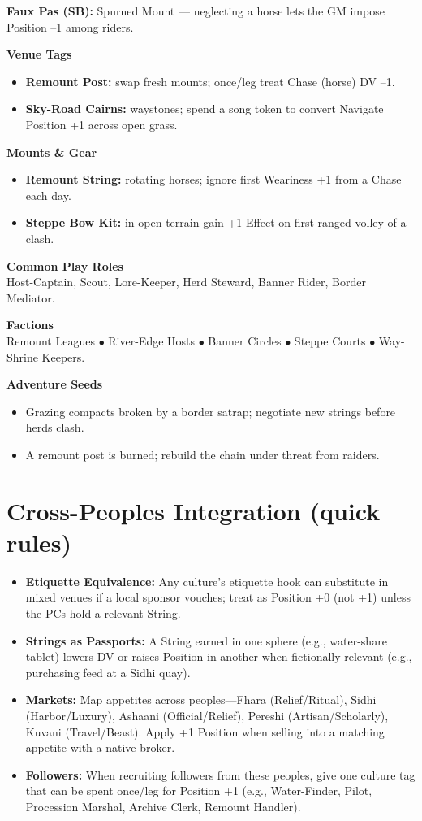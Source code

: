 \documentclass[11pt]{article}
\begin{document}
\textbf{Faux Pas (SB):} Spurned Mount --- neglecting a horse lets the GM impose Position --1 among riders.

\textbf{Venue Tags}
\begin{itemize}
\item \textbf{Remount Post:} swap fresh mounts; once/leg treat Chase (horse) DV --1.
\item \textbf{Sky-Road Cairns:} waystones; spend a song token to convert Navigate Position +1 across open grass.
\end{itemize}

\textbf{Mounts \& Gear}
\begin{itemize}
\item \textbf{Remount String:} rotating horses; ignore first Weariness +1 from a Chase each day.
\item \textbf{Steppe Bow Kit:} in open terrain gain +1 Effect on first ranged volley of a clash.
\end{itemize}

\textbf{Common Play Roles}\\
Host-Captain, Scout, Lore-Keeper, Herd Steward, Banner Rider, Border Mediator.

\textbf{Factions}\\
Remount Leagues $\bullet$ River-Edge Hosts $\bullet$ Banner Circles $\bullet$ Steppe Courts $\bullet$ Way-Shrine Keepers.

\textbf{Adventure Seeds}
\begin{itemize}
\item Grazing compacts broken by a border satrap; negotiate new strings before herds clash.
\item A remount post is burned; rebuild the chain under threat from raiders.
\end{itemize}

\section{Cross-Peoples Integration (quick rules)}
\begin{itemize}
\item \textbf{Etiquette Equivalence:} Any culture's etiquette hook can substitute in mixed venues if a local sponsor vouches; treat as Position +0 (not +1) unless the PCs hold a relevant String.
\item \textbf{Strings as Passports:} A String earned in one sphere (e.g., water-share tablet) lowers DV or raises Position in another when fictionally relevant (e.g., purchasing feed at a Sidhi quay).
\item \textbf{Markets:} Map appetites across peoples---Fhara (Relief/Ritual), Sidhi (Harbor/Luxury), Ashaani (Official/Relief), Pereshi (Artisan/Scholarly), Kuvani (Travel/Beast). Apply +1 Position when selling into a matching appetite with a native broker.
\item \textbf{Followers:} When recruiting followers from these peoples, give one culture tag that can be spent once/leg for Position +1 (e.g., Water-Finder, Pilot, Procession Marshal, Archive Clerk, Remount Handler).
\end{itemize}
\end{document}
